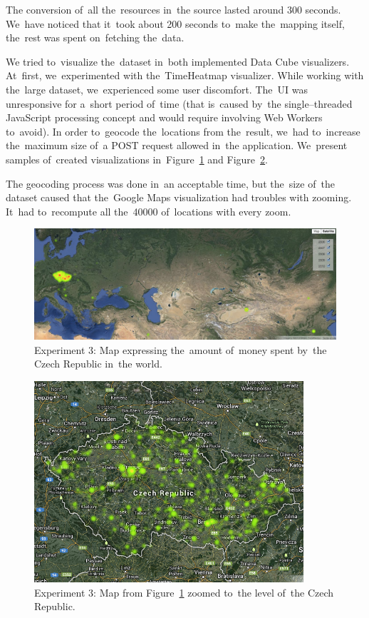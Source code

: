The conversion of~all the~resources in~the source lasted around 300 seconds. We~have noticed that it~took about 200 seconds to~make the~mapping itself, the~rest 
was spent on~fetching the~data.

We tried to~visualize the~dataset in~both implemented Data Cube visualizers. At~first, we~experimented 
with the~TimeHeatmap visualizer. While working with the~large dataset, we~experienced some user discomfort. The~UI was unresponsive for a~short period of~time
(that is~caused by~the single--threaded JavaScript processing concept and would require
involving Web Workers to~avoid). 
In order to~geocode the~locations from the~result, we~had to~increase the~maximum size of~a POST request allowed in~the application. We~present samples of~created visualizations in~Figure~\ref{fig:contracts-map-world} and 
Figure~\ref{fig:contracts-map-zoomed}.

The geocoding process was done in~an acceptable time, but the~size of~the 
dataset caused that the~Google Maps visualization had troubles with zooming. It~had to~recompute all the~40000 of~locations with every zoom.

\begin{figure}
  \centering
  \includegraphics[width=140mm]{img/contracts-map-world.png}
  \caption{Experiment 3: Map expressing the~amount of~money spent by~the Czech Republic in~the world.}
  \label{fig:contracts-map-world}
\end{figure}

\begin{figure}
  \centering
  \includegraphics[width=100mm]{img/contracts-map-zoomed.png}
  \caption{Experiment 3: Map from Figure~\ref{fig:contracts-map-world} zoomed to~the level of~the Czech Republic.}
  \label{fig:contracts-map-zoomed}
\end{figure}

